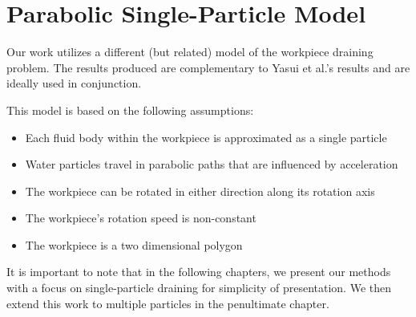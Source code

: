 





\section{Parabolic Single-Particle Model}

Our work utilizes a different (but related) model of the workpiece draining problem. The results produced are complementary to Yasui et al.'s results and are ideally used in conjunction.

This model is based on the following assumptions:

\begin{itemize}
	\item Each fluid body within the workpiece is approximated as a single particle
	\item Water particles travel in parabolic paths that are influenced by acceleration
	\item The workpiece can be rotated in either direction along its rotation axis
	\item The workpiece's rotation speed is non-constant
	\item The workpiece is a two dimensional polygon
\end{itemize}

It is important to note that in the following chapters, we present our methods with a focus on single-particle draining for simplicity of presentation. We then extend this work to multiple particles in the penultimate chapter.

